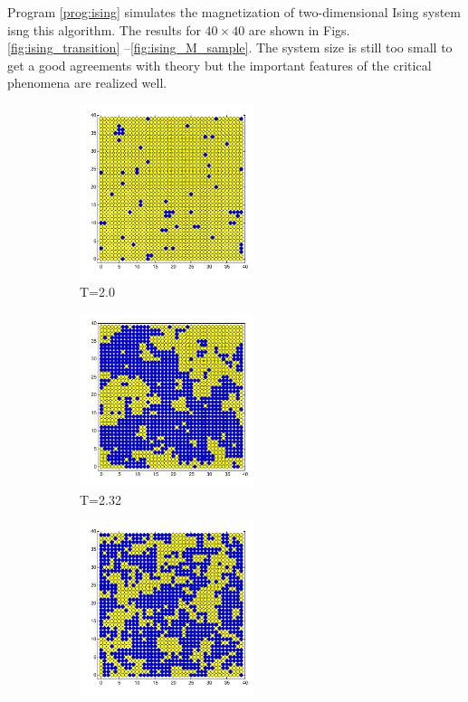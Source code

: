 Program \ref{prog:ising} simulates the  magnetization of two-dimensional Ising system isng this algorithm. The results for $40\times 40$ are shown in Figs. \ref{fig:ising_transition} --\ref{fig:ising_M_sample}.  The system size is still too small to get a good agreements with theory but the important features of the critical phenomena are realized well.


\begin{figure}
	\centering
	\begin{subfigure}{0.32\textwidth}
		\centering
		\includegraphics[width=2in]{17.Metropolis/ising_S_T=200.pdf}
		\caption{T=2.0}
	\end{subfigure}
	\begin{subfigure}{0.32\textwidth}
		\centering
		\includegraphics[width=2in]{17.Metropolis/ising_S_T=232.pdf}
		\caption{T=2.32}
	\end{subfigure}
	\begin{subfigure}{0.32\textwidth}
		\centering
		\includegraphics[width=2in]{17.Metropolis/ising_S_T=300.pdf}

\end{subfigure}
\end{figure}

